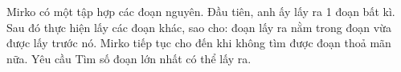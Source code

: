 Mirko có một tập hợp các đoạn nguyên. Đầu tiên, anh ấy lấy ra 1 đoạn bất kì. Sau đó thực hiện lấy các đoạn khác, sao cho: đoạn lấy ra nằm trong đoạn vừa được lấy trước nó. Mirko tiếp tục cho đến khi không tìm được đoạn thoả mãn nữa.
   Yêu cầu  
Tìm số đoạn lớn nhất có thể lấy ra.